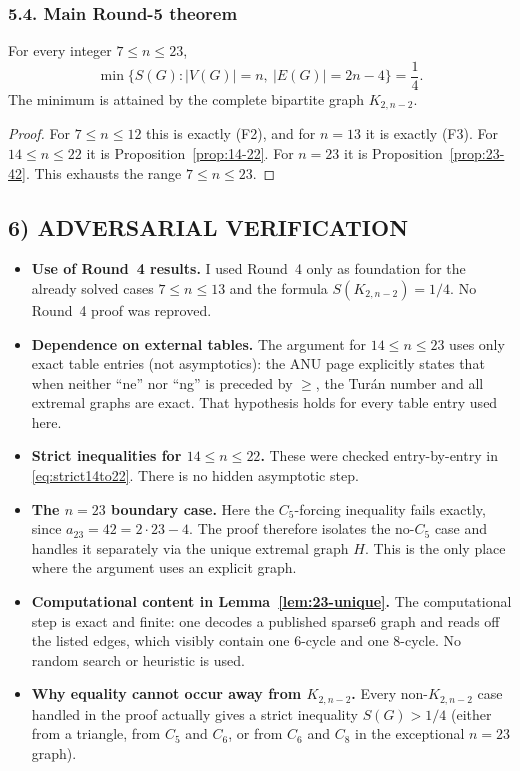 \subsubsection*{5.4. Main Round-5 theorem}

\begin{theorem}[The $K_{2,n-2}$ line through $n=23$]\label{thm:main-round5}
For every integer $7\le n\le 23$,
\[
\min\{S(G): |V(G)|=n,\ |E(G)|=2n-4\}=\frac14.
\]
The minimum is attained by the complete bipartite graph $K_{2,n-2}$.
\end{theorem}

\begin{proof}
For $7\le n\le 12$ this is exactly (F2), and for $n=13$ it is exactly (F3).
For $14\le n\le 22$ it is Proposition~\ref{prop:14-22}.
For $n=23$ it is Proposition~\ref{prop:23-42}.
This exhausts the range $7\le n\le 23$.
\end{proof}

\subsection*{6) ADVERSARIAL VERIFICATION}

\begin{itemize}
\item \textbf{Use of Round~4 results.}
I used Round~4 only as foundation for the already solved cases $7\le n\le 13$ and the formula $S(K_{2,n-2})=1/4$.
No Round~4 proof was reproved.

\item \textbf{Dependence on external tables.}
The argument for $14\le n\le 23$ uses only exact table entries (not asymptotics): the ANU page explicitly states that when neither ``ne'' nor ``ng'' is preceded by $\ge$, the Tur\'an number and all extremal graphs are exact.
That hypothesis holds for every table entry used here.

\item \textbf{Strict inequalities for $14\le n\le 22$.}
These were checked entry-by-entry in \eqref{eq:strict14to22}. There is no hidden asymptotic step.

\item \textbf{The $n=23$ boundary case.}
Here the $C_5$-forcing inequality fails exactly, since $a_{23}=42=2\cdot 23-4$.
The proof therefore isolates the no-$C_5$ case and handles it separately via the unique extremal graph $H$.
This is the only place where the argument uses an explicit graph.

\item \textbf{Computational content in Lemma~\ref{lem:23-unique}.}
The computational step is exact and finite: one decodes a published sparse6 graph and reads off the listed edges, which visibly contain one $6$-cycle and one $8$-cycle.
No random search or heuristic is used.

\item \textbf{Why equality cannot occur away from $K_{2,n-2}$.}
Every non-$K_{2,n-2}$ case handled in the proof actually gives a strict inequality $S(G)>1/4$ (either from a triangle, from $C_5$ and $C_6$, or from $C_6$ and $C_8$ in the exceptional $n=23$ graph).
\end{itemize}

